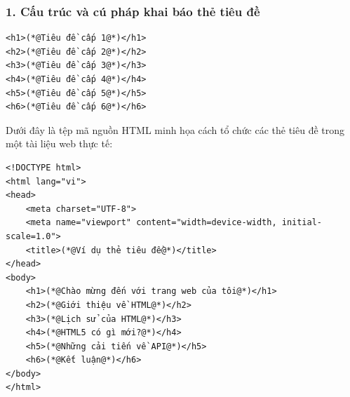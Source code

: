 \documentclass[11pt,oneside]{book}
\begin{document}
\subsubsection{1. Cấu trúc và cú pháp khai báo thẻ tiêu đề}

\begin{codeWindow}
\begin{lstlisting}[language=HTML5]
<h1>(*@Tiêu đề cấp 1@*)</h1>
<h2>(*@Tiêu đề cấp 2@*)</h2>
<h3>(*@Tiêu đề cấp 3@*)</h3>
<h4>(*@Tiêu đề cấp 4@*)</h4>
<h5>(*@Tiêu đề cấp 5@*)</h5>
<h6>(*@Tiêu đề cấp 6@*)</h6>
\end{lstlisting}
\end{codeWindow}

Dưới đây là tệp mã nguồn HTML minh họa cách tổ chức các thẻ tiêu đề trong một tài liệu web thực tế:

\begin{codeWindow}
\begin{lstlisting}[language=HTML5]
<!DOCTYPE html>
<html lang="vi">
<head>
    <meta charset="UTF-8">
    <meta name="viewport" content="width=device-width, initial-scale=1.0">
    <title>(*@Ví dụ thẻ tiêu đề@*)</title>
</head>
<body>
    <h1>(*@Chào mừng đến với trang web của tôi@*)</h1>
    <h2>(*@Giới thiệu về HTML@*)</h2>
    <h3>(*@Lịch sử của HTML@*)</h3>
    <h4>(*@HTML5 có gì mới?@*)</h4>
    <h5>(*@Những cải tiến về API@*)</h5>
    <h6>(*@Kết luận@*)</h6>
</body>
</html>
\end{lstlisting}
\end{codeWindow}
\end{document}
